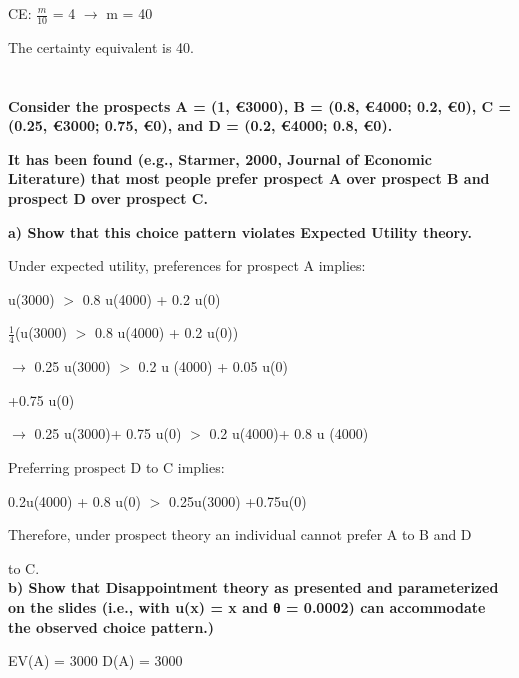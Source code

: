\documentclass{article}
\begin{document}
CE:	$\frac{m}{10}$	=	4 $\rightarrow$ m	=	40

The	certainty	equivalent	is	40.

\section{}
\textbf{Consider the prospects A = (1, €3000), B = (0.8, €4000; 0.2, €0), \linebreak C = (0.25, €3000; 0.75, €0), and D = (0.2, €4000; 0.8, €0). \linebreak}
	  
\textbf{It has been found (e.g., Starmer, 2000, Journal of Economic Literature) that most people prefer prospect A over prospect B and prospect D over prospect C.} 
	  
	 \vspace{2mm} 
	  
\textbf{ a) Show that this choice pattern violates Expected Utility theory.} 
 
  \vspace{2mm}
 
 Under expected utility, preferences for prospect A implies: 
 
 u(3000) $>$ 0.8 u(4000) + 0.2 u(0)
 
 $\frac{1}{4}$(u(3000) $>$ 0.8 u(4000) + 0.2 u(0))
  
 $\rightarrow$ 0.25 u(3000) $>$ 0.2 u (4000) + 0.05 u(0)
    
			    +0.75 u(0)
    
 $\rightarrow$ 0.25 u(3000)+ 0.75 u(0) $>$ 0.2 u(4000)+ 0.8 u (4000)
 
 \vspace{2mm}
 
 Preferring prospect D to C implies: 
 
 0.2u(4000) + 0.8 u(0) $>$ 0.25u(3000) +0.75u(0)
  
   \vspace{2mm}
  
 Therefore, under prospect theory an individual cannot prefer A to B and D 
 
 to C. \\
 
\textbf{ b) Show that Disappointment theory as presented and parameterized on the slides
(i.e., with u(x) = x and θ = 0.0002) can accommodate the observed choice pattern.)} 
  
  \vspace{2mm}
  
  EV(A) = 3000		D(A) = 3000		
  
\end{document}
